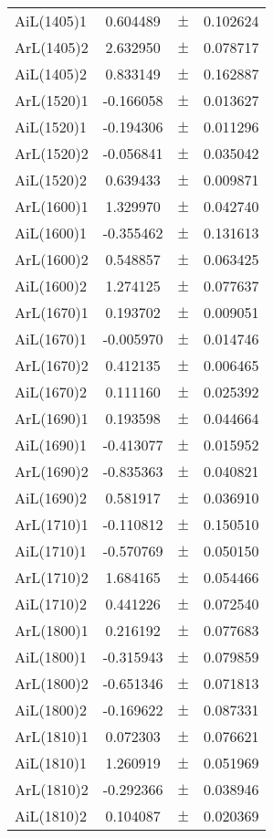 \begin{table}
\begin{tiny}
\begin{tabular}{lccc}
AiL(1405)1 & 0.604489 & $\pm$ & 0.102624 \\
ArL(1405)2 & 2.632950 & $\pm$ & 0.078717 \\
AiL(1405)2 & 0.833149 & $\pm$ & 0.162887 \\
ArL(1520)1 & -0.166058 & $\pm$ & 0.013627 \\
AiL(1520)1 & -0.194306 & $\pm$ & 0.011296 \\
ArL(1520)2 & -0.056841 & $\pm$ & 0.035042 \\
AiL(1520)2 & 0.639433 & $\pm$ & 0.009871 \\
ArL(1600)1 & 1.329970 & $\pm$ & 0.042740 \\
AiL(1600)1 & -0.355462 & $\pm$ & 0.131613 \\
ArL(1600)2 & 0.548857 & $\pm$ & 0.063425 \\
AiL(1600)2 & 1.274125 & $\pm$ & 0.077637 \\
ArL(1670)1 & 0.193702 & $\pm$ & 0.009051 \\
AiL(1670)1 & -0.005970 & $\pm$ & 0.014746 \\
ArL(1670)2 & 0.412135 & $\pm$ & 0.006465 \\
AiL(1670)2 & 0.111160 & $\pm$ & 0.025392 \\
ArL(1690)1 & 0.193598 & $\pm$ & 0.044664 \\
AiL(1690)1 & -0.413077 & $\pm$ & 0.015952 \\
ArL(1690)2 & -0.835363 & $\pm$ & 0.040821 \\
AiL(1690)2 & 0.581917 & $\pm$ & 0.036910 \\
ArL(1710)1 & -0.110812 & $\pm$ & 0.150510 \\
AiL(1710)1 & -0.570769 & $\pm$ & 0.050150 \\
ArL(1710)2 & 1.684165 & $\pm$ & 0.054466 \\
AiL(1710)2 & 0.441226 & $\pm$ & 0.072540 \\
ArL(1800)1 & 0.216192 & $\pm$ & 0.077683 \\
AiL(1800)1 & -0.315943 & $\pm$ & 0.079859 \\
ArL(1800)2 & -0.651346 & $\pm$ & 0.071813 \\
AiL(1800)2 & -0.169622 & $\pm$ & 0.087331 \\
ArL(1810)1 & 0.072303 & $\pm$ & 0.076621 \\
AiL(1810)1 & 1.260919 & $\pm$ & 0.051969 \\
ArL(1810)2 & -0.292366 & $\pm$ & 0.038946 \\
AiL(1810)2 & 0.104087 & $\pm$ & 0.020369 \\

\end{tabular}
\end{tiny}
\end{table}
